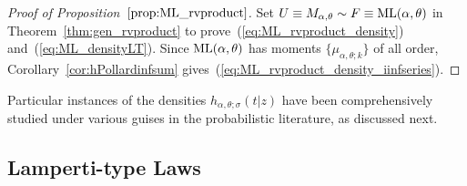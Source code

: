 \documentclass[a4paper,12pt]{article}
\begin{document}
{{\begin{proof} [Proof of Proposition~$\ref{prop:ML_rvproduct}$]
\label{proof:ML_rvproduct}
Set  $U \equiv M_{\alpha,\theta} \sim F\equiv {\rm ML}(\alpha,\theta)$ in Theorem~\ref{thm:gen_rvproduct} 
to prove~(\ref{eq:ML_rvproduct_density}) and~(\ref{eq:ML_densityLT}).
Since ${\rm ML}(\alpha,\theta)$ has moments $\{\mu_{\alpha,\theta;k}\}$ of all order,  
 Corollary~\ref{cor:hPollardinfsum} gives~(\ref{eq:ML_rvproduct_density_iinfseries}).
\end{proof}

 
Particular instances of the densities $h_{\alpha,\theta; \sigma}(t \vert z)$    have been comprehensively  studied 
under various guises in the probabilistic literature, as discussed next.

\subsection{Lamperti-type Laws}
\label{sec:Lamperti-type}

}}
\end{document}
